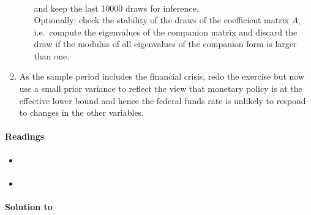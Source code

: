 \begin{enumerate}
\begin{itemize}
\begin{align*}
\end{align*}
and keep the last 10000 draws for inference.
\\
Optionally: check the stability of the draws of the coefficient matrix \(A\),
  i.e.\ compute the eigenvalues of the companion matrix and discard the draw
  if the modulus of all eigenvalues of the companion form is larger than one.
\end{itemize}
\item As the sample period includes the financial crisis,
  redo the exercise but now use a small prior variance to reflect the view that monetary policy is at the effective lower bound
  and hence the federal funds rate is unlikely to respond to changes in the other variables.
\end{enumerate}

\paragraph{Readings}
\begin{itemize}
	\item \textcite[Ch.~5]{Kilian.Lutkepohl_2017_StructuralVectorAutoregressive}
	\item \textcite[Ch.~1-2]{Koop.Korobilis_2010_BayesianMultivariateTime}
\end{itemize}

\begin{solution}\textbf{Solution to }
\ifDisplaySolutions

\fi
\newpage
\end{solution}
